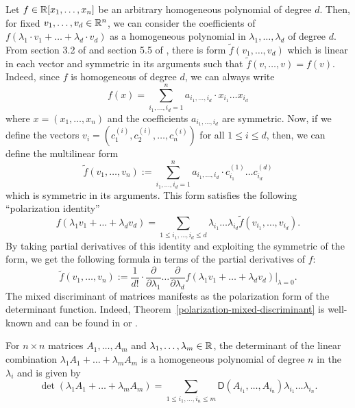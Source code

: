 \documentclass{puthesis-UG}
\begin{document}
Let $f \in \mathbb{R}[x_1, \ldots, x_n]$ be an arbitrary homogeneous polynomial of degree $d$. Then, for fixed $v_1, \ldots, v_d \in \mathbb{R}^n$, we can consider the coefficients of $f(\lambda_1 \cdot v_1 + \ldots + \lambda_d \cdot v_d)$ as a homogeneous polynomial in $\lambda_1, \ldots, \lambda_d$ of degree $d$. From section 3.2 of \cite{lie-groups} and section 5.5 of \cite{schneider_2013}, there is form $\widetilde{f} (v_1, \ldots, v_d)$ which is linear in each vector and symmetric in its arguments such that $\widetilde{f}(v, \ldots, v) = f(v)$. Indeed, since $f$ is homogeneous of degree $d$, we can always write 
\[
	f(x) = \sum_{i_1, \ldots, i_d = 1}^n a_{i_1, \ldots, i_d} \cdot x_{i_1} \ldots x_{i_d}
\]
where $x = (x_1, \ldots, x_n)$ and the coefficients $a_{i_1, \ldots, i_d}$ are symmetric. Now, if we define the vectors $v_i = (c_1^{(i)}, c_2^{(i)}, \ldots, c_n^{(i)})$ for all $1 \leq i \leq d$, then, we can define the multilinear form 
\[
	\widetilde{f}(v_1, \ldots, v_n) := \sum_{i_1, \ldots, i_d = 1}^n a_{i_1, \ldots, i_d} \cdot c_{i_1}^{(1)} \ldots c_{i_d}^{(d)}
\]
which is symmetric in its arguments. This form satisfies the following ``polarization identity''
\[
	f(\lambda_1 v_1 + \ldots + \lambda_d v_d) = \sum_{1 \leq i_1, \ldots, i_d \leq d} \lambda_{i_1} \ldots \lambda_{i_d} \widetilde{f}(v_{i_1}, \ldots, v_{i_d}).
\]
By taking partial derivatives of this identity and exploiting the symmetric of the form, we get the following formula in terms of the partial derivatives of $f$:
\begin{equation} \label{differential-formula-for-mixed-discriminants}
	\widetilde{f}(v_1, \ldots, v_n) := \frac{1}{d!} \cdot \frac{\partial}{\partial \lambda_1} \ldots \frac{\partial}{\partial \lambda_d} f(\lambda_1 v_1 + \ldots + \lambda_d v_d) |_{\lambda = 0}. 
\end{equation}
The mixed discriminant of matrices manifests as the polarization form of the determinant function. Indeed, Theorem~\ref{polarization-mixed-discriminant} is well-known and can be found in \cite{Zhao2015-kf} or \cite{schneider_2013}. 

\begin{thm} \label{polarization-mixed-discriminant}
	For $n \times n$ matrices $A_1, \ldots, A_m$ and $\lambda_1, \ldots, \lambda_m \in \mathbb{R}$, the determinant of the linear combination $\lambda_1 A_1 + \ldots + \lambda_m A_m$ is a homogeneous polynomial of degree $n$ in the $\lambda_i$ and is given by 
	\[
		\det (\lambda_1 A_1 + \ldots + \lambda_m A_m) = \sum_{1 \leq i_1, \ldots, i_n \leq m} \mathsf{D}(A_{i_1}, \ldots, A_{i_n}) \lambda_{i_1} \ldots \lambda_{i_n}. 
	\]
\end{thm}
\end{document}
